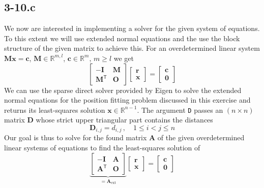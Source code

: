 \documentclass{article}
\begin{document}
\pagebreak

\subsection*{3-10.c}
We now are interested in implementing a solver for the given system of equations. To this extent we will use extended normal equations and the use the block structure of the given matrix to achieve this. For an overdetermined linear system $\mathbf{M}\mathbf{x} = \mathbf{c}$, $\mathbf{M} \in \mathbb{R}^{m,l}$, $\mathbf{c} \in \mathbb{R}^{m}$, $m \geq l$ we get 
\begin{equation*}
    \begin{bmatrix}
        -\mathbf{I} & \mathbf{M} \\
        \mathbf{M}^{\mathsf{T}} & \mathbf{O}
    \end{bmatrix}
    \begin{bmatrix}
        \mathbf{r} \\
        \mathbf{x}
    \end{bmatrix}
    =
    \begin{bmatrix}
        \mathbf{c} \\
        \mathbf{0}
    \end{bmatrix}
\end{equation*}
We can use the sparse direct solver provided by Eigen to solve the extended normal equations for the position fitting problem discussed in this exercise and returns its least-squares solution $\mathbf{x}\in \mathbb{R}^{n-1}$. The argument \verb|D| passes an $\left(n \times n\right)$ matrix $\mathbf{D}$ whose strict upper triangular part contains the distances 
\begin{equation*}
    \mathbf{D}_{i,j} = d_{i, j}\,,\quad 1 \leq i < j \leq n
\end{equation*}
Our goal is thus to solve for the found matrix $\mathbf{A}$ of the given overdetermined linear systems of equations to find the least-squares solution of
\begin{equation*}
\underbrace{
    \begin{bmatrix}
        -\mathbf{I} &  \mathbf{A} \\
        \mathbf{A}^{\mathsf{T}} & \mathbf{O}
    \end{bmatrix}}_{=\mathbf{A}_{\text{ext}}}
    \begin{bmatrix}
        \mathbf{r} \\
        \mathbf{x}
    \end{bmatrix}
    = 
    \begin{bmatrix}
        \mathbf{c} \\
        \mathbf{0}
    \end{bmatrix}
\end{equation*}
\end{document}
